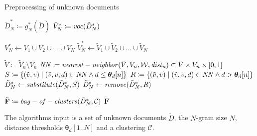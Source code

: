 \begin{algorithm}
\label{alg:preprocess-unknown-data}
\caption{Preprocessing of unknown documents}

\begin{algorithmic}[1]

\State $\tilde{D}_N^* \coloneqq g_N^*(\tilde{D})$ 
\label{alg:preprocess-unknown-data:n-grams}
\State $\tilde{V}_N^* \coloneqq \mathit{voc}(\tilde{D}_N^*)$

\State $V_N^* \gets V_1 \cup V_2 \cup \ldots \cup V_N$ 
\label{alg:preprocess-unknown-data:n-grams-known-partition}
\State $\tilde{V}_N^* \gets \tilde{V}_1 \cup \tilde{V}_2 \cup \ldots \cup
\tilde{V}_N$
\label{alg:preprocess-unknown-data:n-grams-unknown-partition}

\State $\tilde{V} \coloneqq \tilde{V}_n \setminus V_n$
\State $\mathit{NN} \coloneqq \mathit{nearest-neighbor}(\tilde{V}, V_n,\mathcal{W},
\mathit{dist}_n) \subset \tilde{V} \times V_n \times [0,1]$ 
\label{alg:preprocess-unknown-data:nearest-neighbor}
\State $S \coloneqq \left\{(\tilde{v}, v) \mid (\tilde{v}, v,d) \in \mathit{NN}
\land d \leq \boldsymbol \theta_d[n]\right\}$
\label{alg:preprocess-unknown-data:substitutes} 
\State $R \coloneqq \left\{(\tilde{v}, v)\mid (\tilde{v}, v,d) \in \mathit{NN}
\land d > \boldsymbol \theta_d[n]\right\}$ 
\State $\tilde{D}_N^* \gets \mathit{substitute}(\tilde{D}_N^*,S)$
\State $\tilde{D}_N^* \gets \mathit{remove}(\tilde{D}_N^*,R)$
\label{alg:preprocess-unknown-data:substitutes-end}
\EndFor

\State $\mathbf{\tilde{F}} \coloneqq \mathit{bag-of-clusters}(\tilde{D}_N^*, 
\mathcal{C})$ 
\label{alg:preprocess-unknown-data:boc}
\State \Return $\mathbf{\tilde{F}}$
\EndFunction
\end{algorithmic}
\end{algorithm}

The algorithms input is a set of unknown documents $\tilde{D}$, the $N$-gram
size $N$, distance thresholds $\boldsymbol \theta_d[1..N]$ and a clustering
$\mathcal{C}$.

